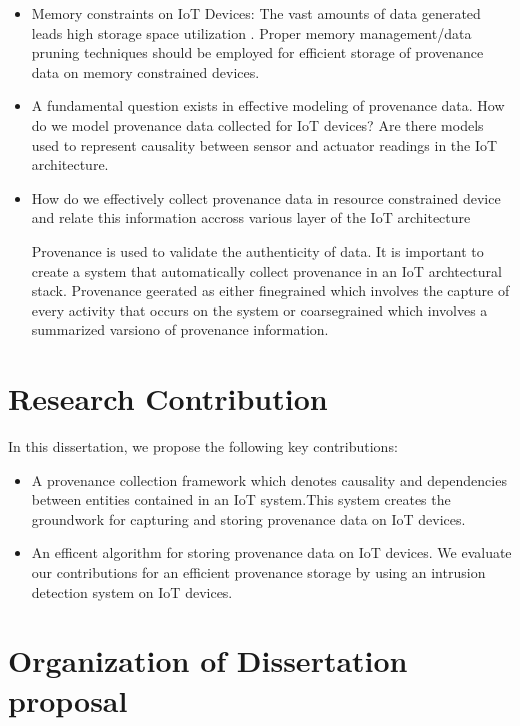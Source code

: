 \begin{itemize}

\item Memory constraints on IoT Devices: The vast amounts of data generated leads high storage space utilization . Proper memory management/data pruning techniques should be employed for efficient storage of provenance data on memory constrained devices. 

\item A fundamental question exists in effective modeling of provenance data. How do we model provenance data collected for IoT devices? Are there models used to represent causality between sensor and actuator readings in the IoT architecture.

\item How do we effectively collect provenance data in resource constrained device and relate this information accross various layer of the IoT architecture




Provenance is used to validate the authenticity of data. It is important to create a system that automatically collect provenance in an IoT archtectural stack. Provenance geerated as either finegrained which involves the capture of every activity that occurs on the system or coarsegrained which involves a summarized varsiono of provenance information.

\end{itemize}

\section{Research Contribution}

In this dissertation, we propose the following key contributions:

\begin{itemize}
  \item A provenance collection framework which denotes causality and dependencies between entities contained in an IoT system.This system creates the groundwork for capturing and storing provenance data  on IoT devices.
  \item An efficent algorithm for storing provenance data on IoT devices. We evaluate our contributions for an efficient provenance storage by using an intrusion detection system on IoT devices.
\end{itemize}

\section{Organization of Dissertation proposal}

